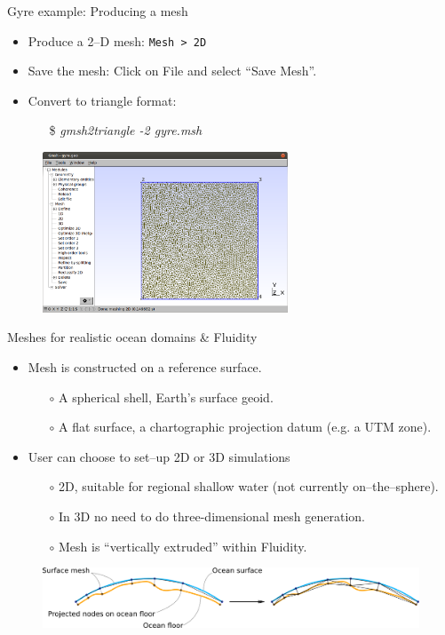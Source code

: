 \documentclass[t]{beamer}
\begin{document}
\begin{frame}{Gyre example: Producing a mesh}
   \begin{itemize}
      \item Produce a 2--D mesh: \lstinline{Mesh > 2D}
      \item Save the mesh: Click on File and select ``Save Mesh''.
      \item Convert to triangle format:
      \begin{itemize}
          \item[\$]\emph{gmsh2triangle -2 gyre.msh}
      \end{itemize}
   \end{itemize}
\begin{figure}[htbp]
 \centering
  \includegraphics[width=0.65\textwidth]{figures/2d-example-Gmsh-mesh}
  \label{fig:shot16}
\end{figure}
\end{frame}

\begin{frame}{Meshes for realistic ocean domains \& Fluidity}
\begin{itemize}
    \item Mesh is constructed on a reference surface.
    \begin{itemize}
        \item[$\circ$] A spherical shell, Earth's surface geoid.
        \item[$\circ$] A flat surface, a chartographic projection datum (e.g. a UTM zone).
    \end{itemize}
    \item User can choose to set--up 2D or 3D simulations
    \begin{itemize}
        \item[$\circ$] 2D, suitable for regional shallow water (not currently on--the--sphere).
        \item[$\circ$] In 3D no need  to do three-dimensional mesh generation.
        \item[$\circ$] Mesh is ``vertically extruded'' within Fluidity.
    \end{itemize}
\end{itemize}
\begin{figure}[htbp!]
 \centering
  \includegraphics[width=1.0\textwidth]{figures/mesh_extrusion.png}
\end{figure}
\end{frame}
\end{document}
